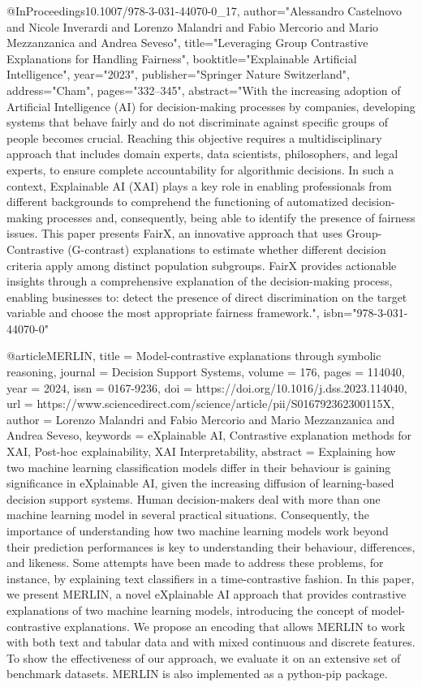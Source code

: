 { 
@InProceedings{10.1007/978-3-031-44070-0_17,
author="Alessandro Castelnovo and Nicole Inverardi and Lorenzo Malandri and Fabio Mercorio and Mario Mezzanzanica and Andrea Seveso",
title="Leveraging Group Contrastive Explanations for Handling Fairness",
booktitle="Explainable Artificial Intelligence",
year="2023",
publisher="Springer Nature Switzerland",
address="Cham",
pages="332--345",
abstract="With the increasing adoption of Artificial Intelligence (AI) for decision-making processes by companies, developing systems that behave fairly and do not discriminate against specific groups of people becomes crucial. Reaching this objective requires a multidisciplinary approach that includes domain experts, data scientists, philosophers, and legal experts, to ensure complete accountability for algorithmic decisions. In such a context, Explainable AI (XAI) plays a key role in enabling professionals from different backgrounds to comprehend the functioning of automatized decision-making processes and, consequently, being able to identify the presence of fairness issues. This paper presents FairX, an innovative approach that uses Group-Contrastive (G-contrast) explanations to estimate whether different decision criteria apply among distinct population subgroups. FairX provides actionable insights through a comprehensive explanation of the decision-making process, enabling businesses to: detect the presence of direct discrimination on the target variable and choose the most appropriate fairness framework.",
isbn="978-3-031-44070-0"
}



@article{MERLIN,
title = {Model-contrastive explanations through symbolic reasoning},
journal = {Decision Support Systems},
volume = {176},
pages = {114040},
year = {2024},
issn = {0167-9236},
doi = {https://doi.org/10.1016/j.dss.2023.114040},
url = {https://www.sciencedirect.com/science/article/pii/S016792362300115X},
author = {Lorenzo Malandri and Fabio Mercorio and Mario Mezzanzanica and Andrea Seveso},
keywords = {eXplainable AI, Contrastive explanation methods for XAI, Post-hoc explainability, XAI Interpretability},
abstract = {Explaining how two machine learning classification models differ in their behaviour is gaining significance in eXplainable AI, given the increasing diffusion of learning-based decision support systems. Human decision-makers deal with more than one machine learning model in several practical situations. Consequently, the importance of understanding how two machine learning models work beyond their prediction performances is key to understanding their behaviour, differences, and likeness. Some attempts have been made to address these problems, for instance, by explaining text classifiers in a time-contrastive fashion. In this paper, we present MERLIN, a novel eXplainable AI approach that provides contrastive explanations of two machine learning models, introducing the concept of model-contrastive explanations. We propose an encoding that allows MERLIN to work with both text and tabular data and with mixed continuous and discrete features. To show the effectiveness of our approach, we evaluate it on an extensive set of benchmark datasets. MERLIN is also implemented as a python-pip package.}
}

}
